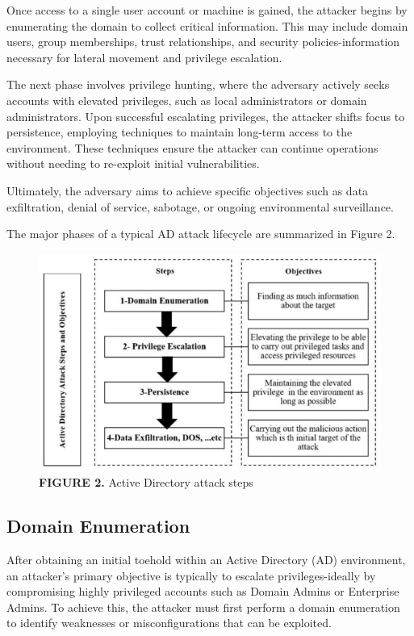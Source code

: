 {Once access to a single user account or machine is gained, the attacker begins by enumerating the domain to collect critical information. This may include domain users, group memberships, trust relationships, and security policies-information necessary for lateral movement and privilege escalation.

The next phase involves privilege hunting, where the adversary actively seeks accounts with elevated privileges, such as local administrators or domain administrators. Upon successful escalating privileges, the attacker shifts focus to persistence, employing techniques to maintain long-term access to the environment. These techniques ensure the attacker can continue operations without needing to re-exploit initial vulnerabilities.

Ultimately, the adversary aims to achieve specific objectives such as data exfiltration, denial of service, sabotage, or ongoing environmental surveillance.

The major phases of a typical AD attack lifecycle are summarized in Figure 2.

\begin{figure}
    \centering
    \includegraphics[width=0.75\linewidth]{attacksteps.png}
    \caption{\textbf{FIGURE 2. }Active Directory attack steps}
    \label{fig:placeholder}
\end{figure}

\subsection{Domain Enumeration}
After obtaining an initial toehold within an Active Directory (AD) environment, an attacker's primary objective is typically to escalate privileges-ideally by compromising highly privileged accounts such as Domain Admins or Enterprise Admins. To achieve this, the attacker must first perform a domain enumeration to identify weaknesses or misconfigurations that can be exploited.

}
